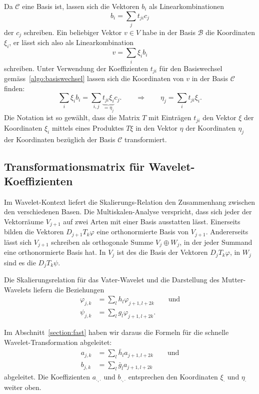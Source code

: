 Da $\mathcal{C}$ eine Basis ist, lassen sich die Vektoren $b_i$ als
Linearkombinationen
\begin{equation}
b_i = \sum_{j}  t_{ji}c_j
\label{algo:basiswechsel}
\end{equation}
der $c_j$ schreiben.
Ein beliebiger Vektor $v\in V$ habe in der Basis $\mathcal{B}$ die
Koordinaten $\xi_i$, er lässt sich also als Linearkombination
\[
v=\sum_{i} \xi_i b_i
\]
schreiben.
Unter Verwendung der Koeffizienten $t_{ji}$ für den Basiswechsel
gemäss~\eqref{algo:basiswechsel} lassen
sich die Koordinaten von $v$ in der Basis $\mathcal{C}$ finden:
\[
\sum_{i} \xi_i b_i
=
\sum_{i,j} \underbrace{t_{ji}\xi_i}_{\displaystyle=\eta_j} c_j.
\qquad\Rightarrow\qquad
\eta_j = \sum_{i} t_{ji} \xi _i.
\]
Die Notation ist so gewählt, dass die Matrix $T$ mit Einträgen $t_{ji}$ 
den Vektor $\xi$ der Koordinaten $\xi_i$ mittels eines Produktes $T\xi$
in den Vektor $\eta$ der Koordinaten $\eta_j$ der Koordinaten bezüglich
der Basis $\mathcal{C}$ transformiert.

\subsection{Transformationsmatrix für Wavelet-Koeffizienten}
Im Wavelet-Kontext liefert die Skalierungs-Relation den Zusammenhang
zwischen den verschiedenen Basen.
Die Multiskalen-Analyse verspricht, dass sich jeder der Vektorräume
$V_{j+1}$ auf zwei Arten mit einer Basis ausstatten lässt.
Einerseits bilden die Vektoren $D_{j+1}T_k\varphi$ eine orthonormierte
Basis von $V_{j+1}$.
Andererseits lässt sich $V_{j+1}$ schreiben als orthogonale Summe
$V_j\oplus W_j$, in der jeder Summand eine orthonormierte Basis hat.
In $V_j$ ist des die Basis der Vektoren $D_jT_k\varphi$, in $W_j$
sind es die $D_jT_k\psi$.

Die Skalierungsrelation für das Vater-Wavelet und die Darstellung des
Mutter-Wavelets liefern die Beziehungen
\begin{align*}
\varphi_{j,k} &= \sum_{l} h_{l}\varphi_{j+1,l+2k}
\qquad\text{und}
\\
\psi_{j,k} &= \sum_{l} g_{l} \varphi_{j+1,l+2k}.
\end{align*}

Im Abschnitt~\ref{section:fast} haben wir daraus die Formeln für
die schnelle Wavelet-Transformation abgeleitet:
\begin{align*}
a_{j,k} &= \sum_{l} \bar{h}_l a_{j+1,l+2k} \qquad\text{und}
\\
b_{j,k} &= \sum_{l} \bar{g}_l a_{j+1,l+2k}
\end{align*}
abgeleitet.
Die Koeffizienten $a_{\cdot,\cdot}$ und $b_{\cdot,\cdot}$ entsprechen
den Koordinaten $\xi_{\cdot}$ und $\eta_{\cdot}$ weiter oben.

